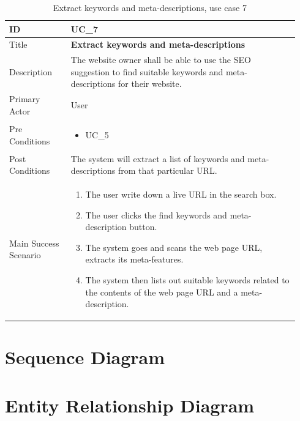\documentclass{scrartcl}
\begin{document}
\begin{table}[H]
  \caption{Extract keywords and meta-descriptions, use case 7}
  \begin{tabular}{p{0.20\linewidth} | p{0.74\linewidth}}
    \toprule
    ID & UC\_7
    \\\midrule
    Title & \textbf{Extract keywords and meta-descriptions}
    \\\hline
    Description & The website owner shall be able to use the SEO suggestion to find suitable keywords and meta-descriptions for their website.
    \\\hline
    Primary Actor & User
    \\\hline
    Pre Conditions & {
                     \begin{itemize}
                     \item UC\_5
                     \end{itemize}
                     }\vspace*{-\baselineskip}
    \\\hline
    Post Conditions & The system will extract a list of keywords and meta-descriptions from that particular URL.
    \\\hline
    Main Success Scenario & {
                            \begin{enumerate}
                            \item The user write down a live URL in the search box.
                            \item The user clicks the find keywords and meta-description button.
                            \item The system goes and scans the web page URL, extracts its meta-features.
                            \item The system then lists out suitable keywords related to the contents of the web page URL and a meta-description.
                            \end{enumerate}
                            }\vspace*{-\baselineskip}
    \\\bottomrule
  \end{tabular}
\end{table}

\section{Sequence Diagram}

\section{Entity Relationship Diagram}
\end{document}
